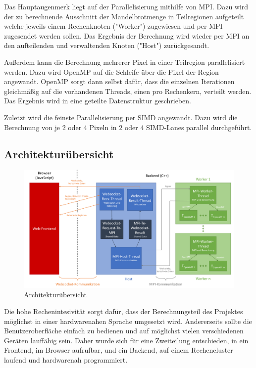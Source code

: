 Das Hauptaugenmerk liegt auf der Parallelisierung mithilfe von MPI.
Dazu wird der zu berechnende Ausschnitt der Mandelbrotmenge in Teilregionen aufgeteilt
welche jeweils einem Rechenknoten ("Worker") zugewiesen und per MPI zugesendet werden sollen.
Das Ergebnis der Berechnung wird wieder per MPI an den aufteilenden und verwaltenden Knoten ("Host")
zurückgesandt.

Außerdem kann die Berechnung mehrerer Pixel in einer Teilregion parallelisiert werden.
Dazu wird OpenMP auf die Schleife über die Pixel der Region angewandt.
OpenMP sorgt dann selbst dafür, dass die einzelnen Iterationen gleichmäßig auf die vorhandenen
Threads, einen pro Rechenkern, verteilt werden.
Das Ergebnis wird in eine geteilte Datenstruktur geschrieben.

Zuletzt wird die feinste Parallelisierung per SIMD angewandt.
Dazu wird die Berechnung von je 2 oder 4 Pixeln in 2 oder 4 SIMD-Lanes parallel durchgeführt.

\subsection{Architekturübersicht}
\begin{figure}
	\centering
	\includegraphics[width=\linewidth]{img/Implementierung/ArchitekturAusfuehrlich.pdf}
	\caption{Architekturübersicht}
	\label{fig:architekturuebersicht_detail}
\end{figure}

Die hohe Rechenintesivität sorgt dafür, dass der Berechnungsteil des Projektes möglichst in einer
hardwarenahen Sprache umgesetzt wird.
Andererseits sollte die Benutzeroberfläche einfach zu bedienen und auf möglichst vielen verschiedenen Geräten lauffähig sein.
Daher wurde sich für eine Zweiteilung entschieden, in ein Frontend, im Browser aufrufbar, und ein Backend, auf einem Rechencluster
laufend und hardwarenah programmiert.

